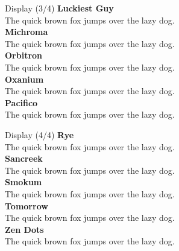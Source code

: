 \documentclass[10pt]{beamer}
\begin{document}
\begin{frame}{Display (3/4)}
\vspace{-0.2cm}
  {\LuckiestGuyLocal\Large\bfseries Luckiest Guy\\}
  {\LuckiestGuyLocal The quick brown fox jumps over the lazy dog.\\[0.3cm]}
  {\MichromaLocal\Large\bfseries Michroma\\}
  {\MichromaLocal The quick brown fox jumps over the lazy dog.\\[0.3cm]}
  {\OrbitronLocal\Large\bfseries Orbitron\\}
  {\OrbitronLocal The quick brown fox jumps over the lazy dog.\\[0.3cm]}
  {\OxaniumLocal\Large\bfseries Oxanium\\}
  {\OxaniumLocal The quick brown fox jumps over the lazy dog.\\[0.3cm]}
  {\PacificoLocal\Large\bfseries Pacifico\\}
  {\PacificoLocal The quick brown fox jumps over the lazy dog.\\[0.3cm]}
\end{frame}

\begin{frame}{Display (4/4)}
\vspace{-0.2cm}
  {\RyeLocal\Large\bfseries Rye\\}
  {\RyeLocal The quick brown fox jumps over the lazy dog.\\[0.3cm]}
  {\SancreekLocal\Large\bfseries Sancreek\\}
  {\SancreekLocal The quick brown fox jumps over the lazy dog.\\[0.3cm]}
  {\SmokumLocal\Large\bfseries Smokum\\}
  {\SmokumLocal The quick brown fox jumps over the lazy dog.\\[0.3cm]}
  {\TomorrowLocal\Large\bfseries Tomorrow\\}
  {\TomorrowLocal The quick brown fox jumps over the lazy dog.\\[0.3cm]}
  {\ZenDotsLocal\Large\bfseries Zen Dots\\}
  {\ZenDotsLocal The quick brown fox jumps over the lazy dog.\\[0.3cm]}
\end{frame}
\end{document}
